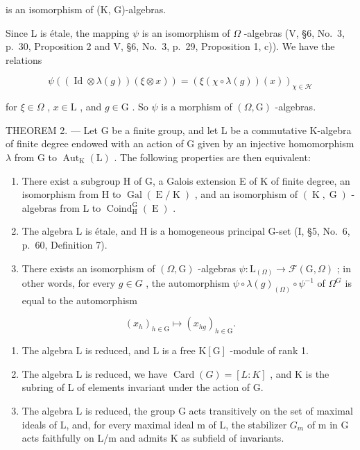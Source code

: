 is an isomorphism of (K, G)-algebras.

Since L is étale, the mapping \(\psi\) is an isomorphism of \(\Omega\) -algebras (V, §6, No.~3, p.~30, Proposition 2 and V, §6, No.~3, p.~29, Proposition 1, c)). We have the relations

\[
\psi ((\operatorname{Id} \otimes \lambda (g)) (\xi \otimes x)) = (\xi (\chi \circ \lambda (g)) (x)) _ {\chi \in \mathscr {H}}
\]

for \(\xi \in \Omega\) , \(x \in \mathrm{L}\) , and \(g \in \mathrm{G}\) . So \(\psi\) is a morphism of \((\Omega, \mathrm{G})\) -algebras.

THEOREM 2. --- Let G be a finite group, and let L be a commutative K-algebra of finite degree endowed with an action of G given by an injective homomorphism \(\lambda\) from G to \(\operatorname{Aut}_{\mathrm{K}}(\mathrm{L})\) . The following properties are then equivalent:

\begin{enumerate}
\def\labelenumi{(\roman{enumi})}
\item
  There exist a subgroup H of G, a Galois extension E of K of finite degree, an isomorphism from H to \(\operatorname{Gal}(\operatorname{E}/\operatorname{K})\) , and an isomorphism of \((\operatorname{K},\operatorname{G})\) -algebras from L to \(\operatorname{Coind}_{\operatorname{H}}^{\operatorname{G}}(\operatorname{E})\) .
\item
  The algebra L is étale, and H is a homogeneous principal G-set (I, §5, No.~6, p.~60, Definition 7).
\item
  There exists an isomorphism of \((\Omega,\mathrm{G})\) -algebras \(\psi:\mathrm{L}_{(\Omega)}\to\mathcal{F}(\mathrm{G},\Omega)\) ; in other words, for every \(g\in G\) , the automorphism \(\psi\circ\lambda(g)_{(\Omega)}\circ\psi^{-1}\) of \(\Omega^{G}\) is equal to the automorphism
\end{enumerate}

\[
(x _ {h}) _ {h \in \mathrm{G}} \longmapsto (x _ {h g}) _ {h \in \mathrm{G}}.
\]

\begin{enumerate}
\def\labelenumi{(\roman{enumi})}
\setcounter{enumi}{3}
\item
  The algebra \(\mathrm{L}\) is reduced, and \(\mathrm{L}\) is a free \(\mathrm{K}[\mathrm{G}]\) -module of rank 1.
\item
  The algebra L is reduced, we have \(\operatorname{Card}(G) = [L : K]\) , and K is the subring of L of elements invariant under the action of G.
\item
  The algebra L is reduced, the group G acts transitively on the set of maximal ideals of L, and, for every maximal ideal m of L, the stabilizer \(G_{m}\) of m in G acts faithfully on L/m and admits K as subfield of invariants.
\end{enumerate}

